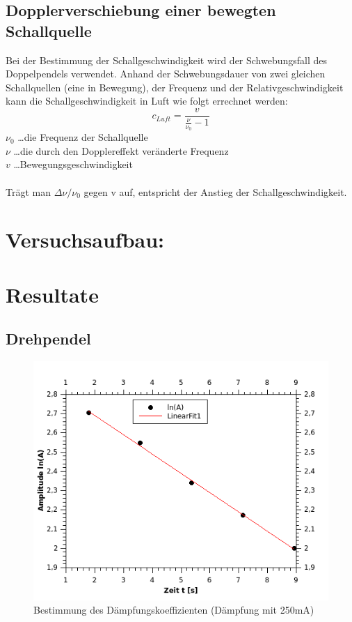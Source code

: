\documentclass[12pt,a4paper]{article}
\begin{document}
\begin{multicols}{2}
\subsection{Dopplerverschiebung einer bewegten Schallquelle}
Bei der Bestimmung der Schallgeschwindigkeit wird der Schwebungsfall des Doppelpendels verwendet. Anhand der Schwebungsdauer von zwei gleichen Schallquellen (eine in Bewegung), der Frequenz und der Relativgeschwindigkeit kann die Schallgeschwindigkeit in Luft wie folgt errechnet werden:
$$c_{Luft} = \frac{v}{\frac{\nu}{\nu_0}-1}$$
$\nu_0$ \ldots die Frequenz der Schallquelle\\ 
$\nu$ \ldots die durch den Dopplereffekt veränderte Frequenz\\
$v$ \ldots Bewegungsgeschwindigkeit\\
\\
Trägt man $\Delta \nu / \nu_0$ gegen v auf, entspricht der Anstieg der Schallgeschwindigkeit.


\section{Versuchsaufbau:}
\pagebreak
\section{Resultate}
\subsection{Drehpendel}

\begin{figure}[H]
	\centering
	\includegraphics[scale=1.8]{./figure/Messung1_Daempfung_omega0.png}
	\caption{Bestimmung des Dämpfungskoeffizienten (Dämpfung mit 250mA)}
	\label{fig:daempfung_omega0_1}
\end{figure}


\end{multicols}
\end{document}
